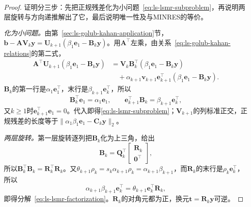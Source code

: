 \begin{proof}
证明分三步：先把正规残差化为小问题~\eqref{eq:ls-lsmr-subproblem}，再说明两层旋转与方向递推解出了它，最后说明唯一性及与MINRES的等价。

\emph{化为小问题。}由第~\ref{sec:ls-golub-kahan-application}节，$\bm b-\bm A\bm V_k\bm y=\bm U_{k+1}(\beta_1\bm e_1-\bm B_k\bm y)$。用$\bm A^\top$左乘，由关系~\eqref{eq:ls-golub-kahan-relations}的第二式，
\[
 \begin{aligned}
 \bm A^\top\bm U_{k+1}(\beta_1\bm e_1-\bm B_k\bm y)
 &=\bm V_k\bm B_k^\top(\beta_1\bm e_1-\bm B_k\bm y)\\
 &\quad+\alpha_{k+1}\bm v_{k+1}\bm e_{k+1}^\top(\beta_1\bm e_1-\bm B_k\bm y).
 \end{aligned}
\]
$\bm B_k$的第一行是$\alpha_1\bm e_1^\top$，末行是$\beta_{k+1}\bm e_k^\top$，所以
\[
 \bm B_k^\top\bm e_1=\alpha_1\bm e_1,\qquad
 \bm e_{k+1}^\top\bm B_k=\beta_{k+1}\bm e_k^\top ,
\]
又$k\ge1$时$\bm e_{k+1}^\top\bm e_1=0$。代入即得\eqref{eq:ls-lsmr-subproblem}；$\bm V_{k+1}$的列标准正交，正规残差的长度等于$\lVert\alpha_1\beta_1\bm e_1-\bm C_k\bm y\rVert_2$。

\emph{两层旋转。}第一层旋转逐列把$\bm B_k$化为上三角，给出
\[
 \bm B_k=\bm Q_k^\top\begin{bmatrix}\bm R_k\\\bm0^\top\end{bmatrix},
\]
所以$\bm B_k^\top\bm B_k=\bm R_k^\top\bm R_k$。又$\theta_{k+1}\rho_k=s_k\alpha_{k+1}\rho_k=\alpha_{k+1}\beta_{k+1}$，而$\bm R_k$的末行是$\rho_k\bm e_k^\top$，所以
\[
 \alpha_{k+1}\beta_{k+1}\bm e_k^\top=\theta_{k+1}\bm e_k^\top\bm R_k ,
\]
即得分解~\eqref{eq:ls-lsmr-factorization}。$\bm R_k$的对角元都为正，换元$\bm t=\bm R_k\bm y$可逆。


\end{proof}
